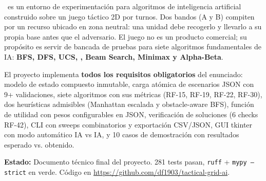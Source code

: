 
\noindent \tacticalgrid\ es un entorno de experimentación para algoritmos de inteligencia artificial
construido sobre un juego táctico 2D por turnos. Dos bandos (A y B) compiten por un recurso
ubicado en zona neutral: una unidad debe recogerlo y llevarlo a su propia base antes que el
adversario. El juego no es un producto comercial; su propósito es servir de bancada de pruebas
para siete algoritmos fundamentales de IA: \textbf{BFS, DFS, UCS, \astar, Beam Search, Minimax y
Alpha-Beta}.

El proyecto implementa \textbf{todos los requisitos obligatorios} del enunciado: modelo de estado
compuesto inmutable, carga atómica de escenarios JSON con 9+ validaciones, siete algoritmos con
sus métricas (RF-15, RF-19, RF-22, RF-30), dos heurísticas admisibles (Manhattan escalada y
obstacle-aware BFS), función de utilidad con pesos configurables en JSON, verificación de
soluciones (6 checks RF-42), CLI con sweeps combinatorios y exportación CSV/JSON, GUI tkinter
con modo automático IA vs IA, y 10 casos de demostración con resultados esperado vs. obtenido.

\textbf{Estado:} Documento técnico final del proyecto. 281 tests pasan,
\texttt{ruff} + \texttt{mypy --strict} en verde. Código en \url{https://github.com/df1903/tactical-grid-ai}.